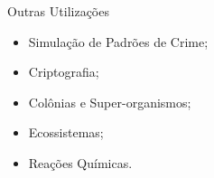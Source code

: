 \documentclass[compress, hide notes]{beamer}
\begin{document}
\begin{frame}{Outras Utilizações \cite{pt}}
		
	\begin{itemize}
	
		\item Simulação de Padrões de Crime;
		
		\bigskip
		
		\item Criptografia;
		
		\bigskip
		
		\item Colônias e Super-organismos;
		
		\bigskip
		
		\item Ecossistemas;
		
		\bigskip
		
		\item Reações Químicas.
	
	\end{itemize}
	
\end{frame}
\end{document}
